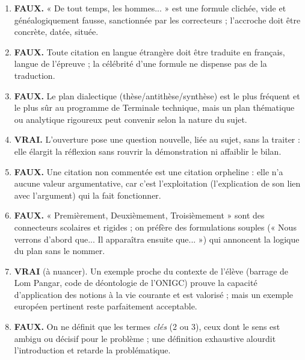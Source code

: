 \documentclass[11pt]{article}
\newcommand{\cle}[1]{{\popxbold\color{popdark}#1}}
\begin{document}
\begin{corrige}
\begin{enumerate}
    \item \textbf{FAUX.} « De tout temps, les hommes... » est une formule clichée, vide et généalogiquement fausse, sanctionnée par les correcteurs ; l'accroche doit être concrète, datée, située.
    \item \textbf{FAUX.} Toute citation en langue étrangère doit être traduite en français, langue de l'épreuve ; la célébrité d'une formule ne dispense pas de la traduction.
    \item \textbf{FAUX.} Le plan dialectique (thèse/antithèse/synthèse) est le plus fréquent et le plus sûr au programme de Terminale technique, mais un plan thématique ou analytique rigoureux peut convenir selon la nature du sujet.
    \item \textbf{VRAI.} L'ouverture pose une question nouvelle, liée au sujet, sans la traiter : elle élargit la réflexion sans rouvrir la démonstration ni affaiblir le bilan.
    \item \textbf{FAUX.} Une citation non commentée est une \cle{citation orpheline} : elle n'a aucune valeur argumentative, car c'est l'exploitation (l'explication de son lien avec l'argument) qui la fait fonctionner.
    \item \textbf{FAUX.} « Premièrement, Deuxièmement, Troisièmement » sont des connecteurs scolaires et rigides ; on préfère des formulations souples (« Nous verrons d'abord que... Il apparaîtra ensuite que... ») qui annoncent la logique du plan sans le nommer.
    \item \textbf{VRAI} (à nuancer). Un exemple proche du contexte de l'élève (barrage de Lom Pangar, code de déontologie de l'ONIGC) prouve la capacité d'application des notions à la vie courante et est valorisé ; mais un exemple européen pertinent reste parfaitement acceptable.
    \item \textbf{FAUX.} On ne définit que les termes \emph{clés} (2 ou 3), ceux dont le sens est ambigu ou décisif pour le problème ; une définition exhaustive alourdit l'introduction et retarde la problématique.
\end{enumerate}
\end{corrige}
\end{document}
